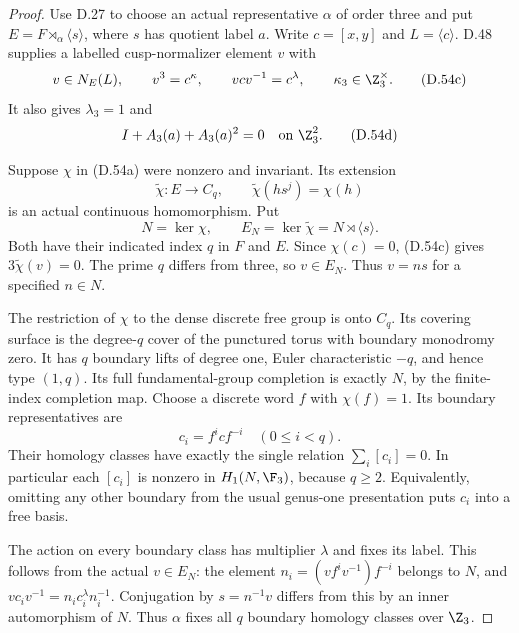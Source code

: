 \begin{proof}
Use D.27 to choose an actual representative
$\alpha$ of order three and put
$E=F\rtimes_\alpha\langle s\rangle$,
where $s$ has quotient label $a$.
Write $c=[x,y]$ and $L=\langle c\rangle$.
D.48 supplies a labelled cusp-normalizer
element $v$ with
\[
       v\in N_E(L),\qquad v^3=c^\kappa,\qquad
       vcv^{-1}=c^\lambda,\qquad
                         \kappa_3\in\Z_3^\times.        \tag{D.54c}
\]
It also gives $\lambda_3=1$ and
\[
                  I+A_3(a)+A_3(a)^2=0
                         \quad\text{on }\Z_3^2.         \tag{D.54d}
\]

Suppose $\chi$ in (D.54a) were nonzero
and invariant. Its extension
\[
       \widetilde\chi:E\longrightarrow C_q,\qquad
              \widetilde\chi(hs^j)=\chi(h)
                                                               \tag{D.54e}
\]
is an actual continuous homomorphism.
Put
\[
               N=\ker\chi,\qquad
               E_N=\ker\widetilde\chi=N\rtimes\langle s\rangle .
                                                               \tag{D.54f}
\]
Both have their indicated index $q$
in $F$ and $E$. Since $\chi(c)=0$,
(D.54c) gives
$3\widetilde\chi(v)=0$. The prime $q$
differs from three, so $v\in E_N$.
Thus $v=ns$ for a specified $n\in N$.

The restriction of $\chi$ to the dense
discrete free group is onto $C_q$.
Its covering surface is the degree-$q$
cover of the punctured torus with
boundary monodromy zero.
It has $q$ boundary lifts of degree one,
Euler characteristic $-q$, and hence
type $(1,q)$. Its full fundamental-group
completion is exactly $N$, by the
finite-index completion map.
Choose a discrete word $f$ with
$\chi(f)=1$. Its boundary representatives
are
\[
                c_i=f^i c f^{-i}\quad(0\leq i<q).
                                                               \tag{D.54g}
\]
Their homology classes have exactly the
single relation $\sum_i[c_i]=0$.
In particular each $[c_i]$ is nonzero
in $H_1(N,\F_3)$, because $q\geq2$.
Equivalently, omitting any other boundary
from the usual genus-one presentation
puts $c_i$ into a free basis.

The action on every boundary class has
multiplier $\lambda$ and fixes its label.
This follows from the actual $v\in E_N$:
the element
$n_i=(vf^iv^{-1})f^{-i}$ belongs to $N$,
and
$vc_iv^{-1}=n_i c_i^\lambda n_i^{-1}$.
Conjugation by $s=n^{-1}v$ differs from
this by an inner automorphism of $N$.
Thus $\alpha$ fixes all $q$ boundary
homology classes over $\Z_3$.


\end{proof}
